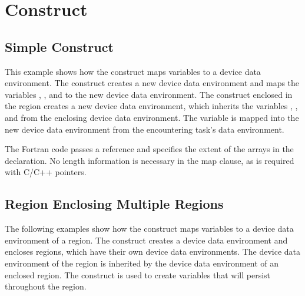 \section{ Construct}
\label{sec:target_data}

\subsection{Simple  Construct}
\label{subsec:target_data_simple}

This example shows how the  construct maps variables
to a device data environment. The  construct creates
a new device data environment and maps the variables , , and  to the new device 
data environment. The  construct enclosed in the 
 region creates a new device data environment, which inherits the
variables , , and  from the enclosing device data environment. The variable 
 is mapped into the new device data environment from the encountering task's data 
environment.


The Fortran code passes a reference and specifies the extent of the arrays in the 
declaration. No length information is necessary in the map clause, as is required 
with C/C++ pointers.


\subsection{ Region Enclosing Multiple  Regions}
\label{subsec:target_data_multiregion}

The following examples show how the  construct maps
variables to a device data environment of a  region. 
The  construct creates a device data environment and encloses 
regions, which have their own device data environments. The device data environment 
of the  region is inherited by the device data environment
of an enclosed  region. The  construct
is used to create variables that will persist throughout the 
region.

